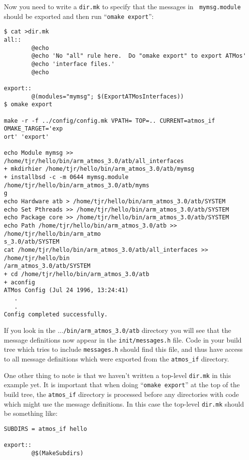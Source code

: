 \documentclass[11pt,twoside,onecolumn]{article}
\begin{document}
Now you need to write a {\tt dir.mk} to specify that the messages in {\tt
mymsg.module} should be exported and then run ``{\tt omake export}'':

{\footnotesize \begin{verbatim}
$ cat >dir.mk
all::
        @echo
        @echo 'No "all" rule here.  Do "omake export" to export ATMos'
        @echo 'interface files.'
        @echo

export::
        @(modules="mymsg"; $(ExportATMosInterfaces))
$ omake export

make -r -f ../config/config.mk VPATH= TOP=.. CURRENT=atmos_if OMAKE_TARGET='exp
ort' 'export'

echo Module mymsg >> /home/tjr/hello/bin/arm_atmos_3.0/atb/all_interfaces
+ mkdirhier /home/tjr/hello/bin/arm_atmos_3.0/atb/mymsg 
+ installbsd -c -m 0644 mymsg.module /home/tjr/hello/bin/arm_atmos_3.0/atb/myms
g 
echo Hardware atb > /home/tjr/hello/bin/arm_atmos_3.0/atb/SYSTEM
echo Set Pthreads >> /home/tjr/hello/bin/arm_atmos_3.0/atb/SYSTEM
echo Package core >> /home/tjr/hello/bin/arm_atmos_3.0/atb/SYSTEM
echo Path /home/tjr/hello/bin/arm_atmos_3.0/atb >> /home/tjr/hello/bin/arm_atmo
s_3.0/atb/SYSTEM
cat /home/tjr/hello/bin/arm_atmos_3.0/atb/all_interfaces >> /home/tjr/hello/bin
/arm_atmos_3.0/atb/SYSTEM
+ cd /home/tjr/hello/bin/arm_atmos_3.0/atb 
+ aconfig 
ATMos Config (Jul 24 1996, 13:24:41)
   .
   .
Config completed successfully.
\end{verbatim}}

If you look in the ...\verb|/bin/arm_atmos_3.0/atb| directory you will see that
the message definitions now appear in the \verb|init/messages.h| file.  Code in
your build tree which tries to include \verb|messages.h| should find this file,
and thus have access to all message definitions which were exported from the
\verb|atmos_if| directory.

One other thing to note is that we haven't written a top-level {\tt dir.mk} in
this example yet.  It is important that when doing ``{\tt omake export}'' at
the top of the build tree, the \verb|atmos_if| directory is processed before
any directories with code which might use the message definitions.  In this
case the top-level {\tt dir.mk} should be something like:

{\footnotesize \begin{verbatim}
SUBDIRS = atmos_if hello

export::
        @$(MakeSubdirs)
\end{verbatim}}
\end{document}
